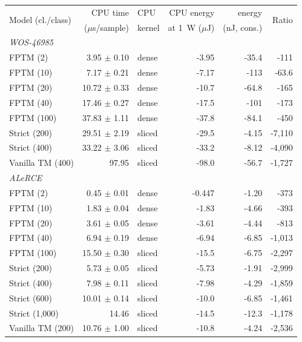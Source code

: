 \begin{tabular}{lrlrrr}
\toprule
\multirow{2}{*}{Model (cl./class)} & CPU time & CPU & CPU energy & \gainp{} energy & \multirow{2}{*}{Ratio} \\
 & ($\mu$s/sample) & kernel & at 1~W ($\mu$J) & (nJ, cons.) & \\
\midrule
\multicolumn{6}{l}{\textit{WOS-46985}} \\
FPTM (2) & 3.95 $\pm$ 0.10 & dense & \hyp{3.95} & \hyp{35.4} & \hyp{111} \\
FPTM (10) & 7.17 $\pm$ 0.21 & dense & \hyp{7.17} & \hyp{113} & \hyp{63.6} \\
FPTM (20) & 10.72 $\pm$ 0.33 & dense & \hyp{10.7} & \hyp{64.8} & \hyp{165} \\
FPTM (40) & 17.46 $\pm$ 0.27 & dense & \hyp{17.5} & \hyp{101} & \hyp{173} \\
FPTM (100) & 37.83 $\pm$ 1.11 & dense & \hyp{37.8} & \hyp{84.1} & \hyp{450} \\
Strict (200) & 29.51 $\pm$ 2.19 & sliced & \hyp{29.5} & \hyp{4.15} & \hyp{7,110} \\
Strict (400) & 33.22 $\pm$ 3.06 & sliced & \hyp{33.2} & \hyp{8.12} & \hyp{4,090} \\
Vanilla TM (400) & 97.95 & sliced & \hyp{98.0} & \hyp{56.7} & \hyp{1,727} \\
\midrule
\multicolumn{6}{l}{\textit{ALeRCE}} \\
FPTM (2) & 0.45 $\pm$ 0.01 & dense & \hyp{0.447} & \hyp{1.20} & \hyp{373} \\
FPTM (10) & 1.83 $\pm$ 0.04 & dense & \hyp{1.83} & \hyp{4.66} & \hyp{393} \\
FPTM (20) & 3.61 $\pm$ 0.05 & dense & \hyp{3.61} & \hyp{4.44} & \hyp{813} \\
FPTM (40) & 6.94 $\pm$ 0.19 & dense & \hyp{6.94} & \hyp{6.85} & \hyp{1,013} \\
FPTM (100) & 15.50 $\pm$ 0.30 & sliced & \hyp{15.5} & \hyp{6.75} & \hyp{2,297} \\
Strict (200) & 5.73 $\pm$ 0.05 & sliced & \hyp{5.73} & \hyp{1.91} & \hyp{2,999} \\
Strict (400) & 7.98 $\pm$ 0.11 & sliced & \hyp{7.98} & \hyp{4.29} & \hyp{1,859} \\
Strict (600) & 10.01 $\pm$ 0.14 & sliced & \hyp{10.0} & \hyp{6.85} & \hyp{1,461} \\
Strict (1,000) & 14.46 & sliced & \hyp{14.5} & \hyp{12.3} & \hyp{1,178} \\
Vanilla TM (200) & 10.76 $\pm$ 1.00 & sliced & \hyp{10.8} & \hyp{4.24} & \hyp{2,536} \\

\end{tabular}
